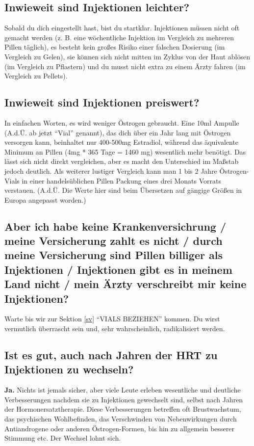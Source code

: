 \documentclass{article}
\begin{document}
\subsection{Inwieweit sind Injektionen leichter?}

Sobald du dich eingestellt hast, bist du startklar. Injektionen müssen nicht oft gemacht werden (z. B. eine wöchentliche Injektion im Vergleich zu mehreren Pillen täglich), es besteht kein großes Risiko einer falschen Dosierung (im Vergleich zu Gelen), sie können sich nicht mitten im Zyklus von der Haut ablösen (im Vergleich zu Pflastern) und du musst nicht extra zu einem Ärzty fahren (im Vergleich zu Pellets).

\subsection{Inwieweit sind Injektionen preiswert?}

In einfachen Worten, es wird weniger Östrogen gebraucht. Eine 10ml Ampulle (A.d.Ü. ab jetzt “Vial” genannt), das dich über ein Jahr lang mit Östrogen versorgen kann, beinhaltet nur 400-500mg Estradiol, während das äquivalente Minimum an Pillen (4mg * 365 Tage = 1460 mg) wesentlich mehr benötigt. Das lässt sich nicht direkt vergleichen, aber es macht den Unterschied im Maßstab jedoch deutlich. Als weiterer lustiger Vergleich kann man 1 bis 2 Jahre Östrogen-Vials in einer handelsüblichen Pillen Packung eines drei Monats Vorrats verstauen. (A.d.Ü. Die Werte hier sind beim Übersetzen auf gängige Größen in Europa angepasst worden.)

\subsection{Aber ich habe keine Krankenversichrung / meine Versicherung zahlt es nicht / durch meine Versicherung sind Pillen billiger als Injektionen / Injektionen gibt es in meinem Land nicht / mein Ärzty verschreibt mir keine Injektionen?}

Warte bis wir zur Sektion \ref{sv} “VIALS BEZIEHEN” kommen. Du wirst vermutlich überrascht sein und, sehr wahrscheinlich, radikalisiert werden.

\subsection{Ist es gut, auch nach Jahren der HRT zu Injektionen zu wechseln?}

\textbf{Ja.} Nichts ist jemals sicher, aber viele Leute erleben wesentliche und deutliche Verbesserungen nachdem sie zu Injektionen gewechselt sind, selbst nach Jahren der Hormonersatztherapie. Diese Verbesserungen betreffen oft Brustwachstum, das psychischen Wohlbefinden, das Verschwinden von Nebenwirkungen durch Antiandrogene oder anderen Östrogen-Formen, bis hin zu allgemein besserer Stimmung etc. Der Wechsel lohnt sich.
\end{document}

